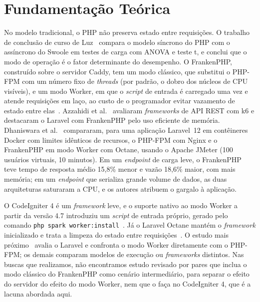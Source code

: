 \documentclass[sigconf, nonacm, screen, language=portuguese, language=spanish, language={main=english}]{acmart}
\begin{document}
\section{Fundamentação Teórica}
No modelo tradicional, o PHP não preserva estado entre requisições. O trabalho de conclusão de curso de Luz~\cite{luz2024} compara o modelo síncrono do PHP com o assíncrono do Swoole em testes de carga com ANOVA e teste t, e conclui que o modo de operação é o fator determinante do desempenho. O FrankenPHP, construído sobre o servidor Caddy, tem um modo clássico, que substitui o PHP-FPM com um número fixo de \textit{threads} (por padrão, o dobro dos núcleos de CPU visíveis), e um modo Worker, em que o \textit{script} de entrada é carregado uma vez e atende requisições em laço, ao custo de o programador evitar vazamento de estado entre elas~\cite{dungalas2024}. Azzahidi et al.~\cite{azzahidi2025} avaliaram \textit{frameworks} de API REST com k6 e destacaram o Laravel com FrankenPHP pelo uso eficiente de memória. Dhaniswara et al.~\cite{dhaniswara2025} compararam, para uma aplicação Laravel~12 em contêineres Docker com limites idênticos de recursos, o PHP-FPM com Nginx e o FrankenPHP em modo Worker com Octane, usando o Apache JMeter (100 usuários virtuais, 10 minutos). Em um \textit{endpoint} de carga leve, o FrankenPHP teve tempo de resposta médio 15,8\% menor e vazão 18,6\% maior, com mais memória; em um \textit{endpoint} que serializa grande volume de dados, as duas arquiteturas saturaram a CPU, e os autores atribuem o gargalo à aplicação.

O CodeIgniter 4 é um \textit{framework} leve, e o suporte nativo ao modo Worker a partir da versão 4.7 introduziu um \textit{script} de entrada próprio, gerado pelo comando \texttt{php spark worker:install}~\cite{codeigniter2024}. Já o Laravel Octane mantém o \textit{framework} inicializado e trata a limpeza do estado entre requisições~\cite{otwell2024}. O estudo mais próximo~\cite{dhaniswara2025} avalia o Laravel e confronta o modo Worker diretamente com o PHP-FPM; os demais comparam modelos de execução ou \textit{frameworks} distintos. Nas buscas que realizamos, não encontramos estudo revisado por pares que inclua o modo clássico do FrankenPHP como cenário intermediário, para separar o efeito do servidor do efeito do modo Worker, nem que o faça no CodeIgniter 4, que é a lacuna abordada aqui.
\end{document}
